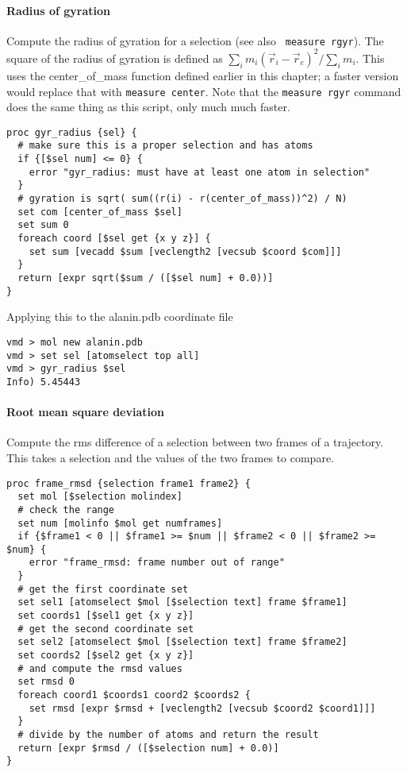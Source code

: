 \paragraph{Radius of gyration}
Compute the radius of gyration for a selection (see also {\tt
measure rgyr}).  The square of the radius of gyration is
defined as $\sum_i m_i (\vec r_i - \vec r_c)^2/\sum_i m_i$.  
This uses the center\_of\_mass function defined earlier in
this chapter; a faster version would replace that with {\tt measure
center}.  Note that the {\tt measure rgyr} command does the same thing
as this script, only much much faster.

\begin{verbatim}
proc gyr_radius {sel} {
  # make sure this is a proper selection and has atoms
  if {[$sel num] <= 0} {
    error "gyr_radius: must have at least one atom in selection"
  }
  # gyration is sqrt( sum((r(i) - r(center_of_mass))^2) / N)
  set com [center_of_mass $sel]
  set sum 0
  foreach coord [$sel get {x y z}] {
    set sum [vecadd $sum [veclength2 [vecsub $coord $com]]]
  }
  return [expr sqrt($sum / ([$sel num] + 0.0))]
}
\end{verbatim}

Applying this to the alanin.pdb coordinate file
\begin{verbatim}
vmd > mol new alanin.pdb
vmd > set sel [atomselect top all]
vmd > gyr_radius $sel
Info) 5.45443
\end{verbatim}

\paragraph{Root mean square deviation}
Compute the rms difference of a selection between two frames of a
trajectory. This takes a selection and the values of the two frames to compare.
\begin{verbatim}
proc frame_rmsd {selection frame1 frame2} {
  set mol [$selection molindex]
  # check the range
  set num [molinfo $mol get numframes]
  if {$frame1 < 0 || $frame1 >= $num || $frame2 < 0 || $frame2 >= $num} {
    error "frame_rmsd: frame number out of range"
  }
  # get the first coordinate set
  set sel1 [atomselect $mol [$selection text] frame $frame1]
  set coords1 [$sel1 get {x y z}]
  # get the second coordinate set
  set sel2 [atomselect $mol [$selection text] frame $frame2]
  set coords2 [$sel2 get {x y z}]
  # and compute the rmsd values
  set rmsd 0
  foreach coord1 $coords1 coord2 $coords2 {
    set rmsd [expr $rmsd + [veclength2 [vecsub $coord2 $coord1]]]
  }
  # divide by the number of atoms and return the result
  return [expr $rmsd / ([$selection num] + 0.0)]
}
\end{verbatim}

